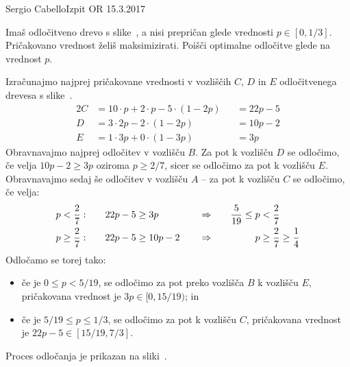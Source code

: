 \begin{naloga}{Sergio Cabello}{Izpit OR 15.3.2017}
\begin{vprasanje}
Imaš odločitveno drevo s slike~\fig,
a nisi prepričan glede vrednosti $p \in [0, 1/3]$.
Pričakovano vrednost želiš maksimizirati.
Poišči optimalne odločitve glede na vrednost $p$.

\begin{slika}
\pgfslika
{}
\end{slika}
\end{vprasanje}

\begin{odgovor}
Izračunajmo najprej pričakovane vrednosti v vozliščih $C$, $D$ in $E$
odločitvenega drevesa s slike~\fig.
\begin{alignat*}{2}
C &= 10 \cdot p + 2 \cdot p - 5 \cdot (1-2p) &&= 22p - 5 \\
D &= 3 \cdot 2p - 2 \cdot (1-2p) &&= 10p - 2 \\
E &= 1 \cdot 3p + 0 \cdot (1 - 3p) &&= 3p
\end{alignat*}
Obravnavajmo najprej odločitev v vozlišču $B$.
Za pot k vozlišču $D$ se odločimo,
če velja $10p - 2 \ge 3p$ oziroma $p \ge 2/7$,
sicer se odločimo za pot k vozlišču $E$.
Obravnavajmo sedaj še odločitev v vozlišču $A$
-- za pot k vozlišču $C$ se odločimo, če velja:
\begin{alignat*}{4}
p < {2 \over 7}: &\quad& 22p - 5 &\ge 3p
&\quad&\Rightarrow \quad & {5 \over 19} \le p &< {2 \over 7} \\
p \ge {2 \over 7}: &\quad& 22p - 5 &\ge 10p-2
&\quad&\Rightarrow \quad & p &\ge {2 \over 7} \ge {1 \over 4}
\end{alignat*}
Odločamo se torej tako:
\begin{itemize}
\item če je $0 \le p < 5/19$,
se odločimo za pot preko vozlišča $B$ k vozlišču $E$,
pričakovana vrednost je $3p \in [0, 15/19)$; in
\item če je $5/19 \le p \le 1/3$,
se odločimo za pot k vozlišču $C$,
pričakovana vrednost je $22p-5 \in [15/19, 7/3]$.
\end{itemize}
Proces odločanja je prikazan na sliki~.

\begin{slika}
\end{slika}
\end{odgovor}
\end{naloga}
